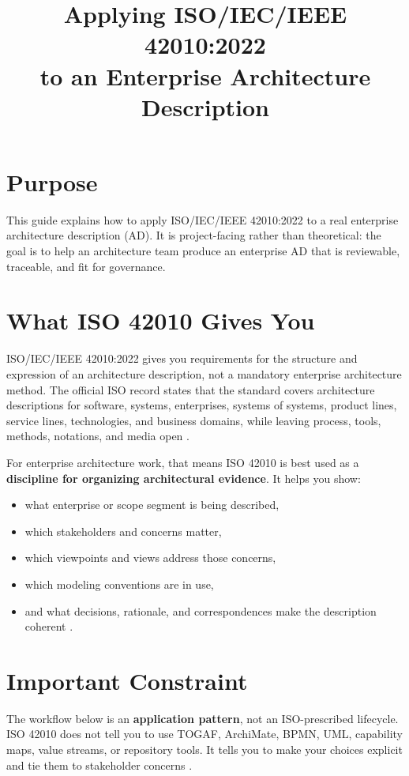 \documentclass[11pt]{article}
\title{Applying ISO/IEC/IEEE 42010:2022\\to an Enterprise Architecture Description}
\author{}
\date{}
\begin{document}
\maketitle

\section*{Purpose}
This guide explains how to apply ISO/IEC/IEEE 42010:2022 to a real enterprise architecture description (AD). It is project-facing rather than theoretical: the goal is to help an architecture team produce an enterprise AD that is reviewable, traceable, and fit for governance.

\section*{What ISO 42010 Gives You}
ISO/IEC/IEEE 42010:2022 gives you requirements for the structure and expression of an architecture description, not a mandatory enterprise architecture method. The official ISO record states that the standard covers architecture descriptions for software, systems, enterprises, systems of systems, product lines, service lines, technologies, and business domains, while leaving process, tools, methods, notations, and media open \cite{iso42010}.

For enterprise architecture work, that means ISO 42010 is best used as a \textbf{discipline for organizing architectural evidence}. It helps you show:
\begin{itemize}
    \item what enterprise or scope segment is being described,
    \item which stakeholders and concerns matter,
    \item which viewpoints and views address those concerns,
    \item which modeling conventions are in use,
    \item and what decisions, rationale, and correspondences make the description coherent \cite{iso42010,cm42010}.
\end{itemize}

\section*{Important Constraint}
The workflow below is an \textbf{application pattern}, not an ISO-prescribed lifecycle. ISO 42010 does not tell you to use TOGAF, ArchiMate, BPMN, UML, capability maps, value streams, or repository tools. It tells you to make your choices explicit and tie them to stakeholder concerns \cite{iso42010}.
\end{document}
